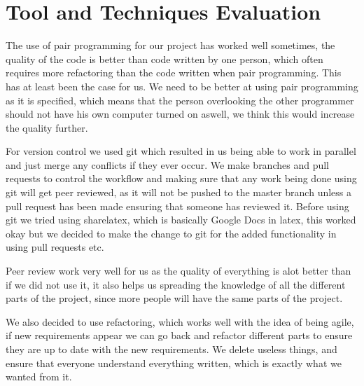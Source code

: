 \section{Tool and Techniques Evaluation}

The use of pair programming for our project has worked well sometimes, the quality of the code is better than code written by one person, which often requires more refactoring than the code written when pair programming.
This has at least been the case for us. 
We need to be better at using pair programming as it is specified, which means that the person overlooking the other programmer should not have his own computer turned on aswell, we think this would increase the quality further. 

For version control we used git which resulted in us being able to work in parallel and just merge any conflicts if they ever occur.
We make branches and pull requests to control the workflow and making sure that any work being done using git will get peer reviewed, as it will not be pushed to the master branch unless a pull request has been made ensuring that someone has reviewed it.
Before using git we tried using sharelatex, which is basically Google Docs in latex, this worked okay but we decided to make the change to git for the added functionality in using pull requests etc.

Peer review work very well for us as the quality of everything is alot better than if we did not use it, it also helps us spreading the knowledge of all the different parts of the project, since more people will have the same parts of the project.

We also decided to use refactoring, which works well with the idea of being agile, if new requirements appear we can go back and refactor different parts to ensure they are up to date with the new requirements.
We delete useless things, and ensure that everyone understand everything written, which is exactly what we wanted from it.
